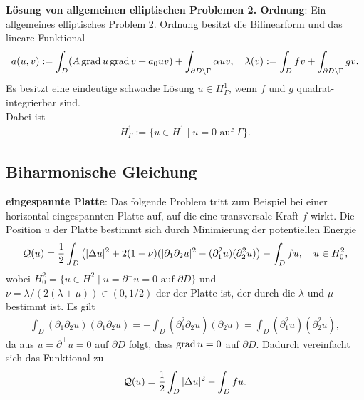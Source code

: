 \linie

\textbf{Lösung von allgemeinen elliptischen Problemen 2. Ordnung}:
Ein allgemeines elliptisches Problem 2. Ordnung besitzt die Bilinearform
und das lineare Funktional
\begin{align*}
    a(u, v) := \int_D (A \operatorname{grad} u \operatorname{grad} v + a_0 uv) +
    \int_{\partial D \setminus \Gamma} \alpha uv,\quad
    \lambda(v) := \int_D fv + \int_{\partial D \setminus \Gamma} gv.
\end{align*}
Es besitzt eine eindeutige schwache Lösung $u \in H_\Gamma^1$,
wenn $f$ und $g$ quadrat-integrierbar sind.\\
Dabei ist
\begin{align*}
    H_\Gamma^1 := \{u \in H^1 \;|\; u = 0 \text{ auf } \Gamma\}.
\end{align*}

\pagebreak

\subsection{%
    Biharmonische Gleichung%
}

\textbf{eingespannte Platte}:
Das folgende Problem tritt zum Beispiel bei einer horizontal eingespannten Platte auf,
auf die eine transversale Kraft $f$ wirkt.
Die Position $u$ der Platte bestimmt sich durch Minimierung der potentiellen Energie
\begin{align*}
    \mathcal{Q}(u) = \frac{1}{2} \int_D \left(|\Delta u|^2 + 2(1 - \nu) (|\partial_1 \partial_2 u|^2 -
    (\partial_1^2 u) (\partial_2^2 u)\right) - \int_D fu,\quad u \in H_0^2,
\end{align*}
wobei $H_0^2 = \{u \in H^2 \;|\; u = \partial^\perp u = 0 \text{ auf } \partial D\}$ und
$\nu = \lambda/(2(\lambda + \mu)) \in (0, 1/2)$ der
 der Platte ist,
der durch die  $\lambda$ und $\mu$ bestimmt ist.
Es gilt
\begin{align*}
    \int_D (\partial_1 \partial_2 u) (\partial_1 \partial_2 u)
    = -\int_D (\partial_1^2 \partial_2 u) (\partial_2 u)
    = \int_D (\partial_1^2 u) (\partial_2^2 u),
\end{align*}
da aus $u = \partial^\perp u = 0$ auf $\partial D$ folgt, dass $\operatorname{grad} u = 0$ auf $\partial D$.
Dadurch vereinfacht sich das Funktional zu
\begin{align*}
    \mathcal{Q}(u) = \frac{1}{2} \int_D |\Delta u|^2 - \int_D fu.
\end{align*}

